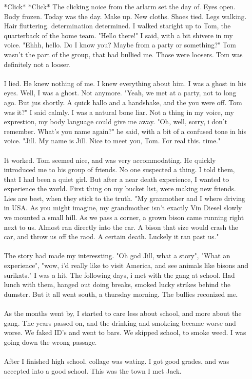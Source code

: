 \documentclass[]{article}
\begin{document}
*Click* *Click* The clicking noice from the arlarm set the day of. Eyes open. Body frozen. Today was the day. Make up. New cloths. Shoes tied. Legs walking. Hair fluttering. determination determined. I walked staright up to Tom, the quarterback of the home team. "Hello there!" I said, with a bit shivere in my voice. "Ehhh, hello. Do I know you? Maybe from a party or something?" Tom wasn't the part of the group, that had bullied me. Those were loosers. Tom was definitely not a looser.
\\ \\
I lied. He knew nothing of me. I knew everything about him. I was a ghost in his eyes. Well, I was a ghost. Not anymore. "Yeah, we met at a party, not to long ago. But jus shortly. A quick hallo and a handshake, and the you were off. Tom was it?" I said calmly. I was a natural bone liar. Not a thing in my voice, my exprestion, my body language could give me away. "Oh, well, sorry, i don't remember. What's you name again?" he said, with a bit of a confused tone in his voice. "Jill. My name is Jill. Nice to meet you, Tom. For real this. time."
\\ \\
It worked. Tom seemed nice, and was very accommodating. He quickly  introduced me to his group of friends. No one suspected a thing. I told them, that I had been a quiet girl. But after a near death experience, I wanted to experience the world. First thing on my bucket list, were making new friends. Lies are best, when they stick to the truth. "My granmother and I where driving in USA. As you might imagine, my grandmother isn't exactly Vin Diesel slowly we mounted a small hill. As we pass a corner, a grown bison came running right next to us. Almost ran directly into the car. A bison that size would crash the car, and throw us off the raod. A certain death. Luckely it ran past us."
\\ \\
The story had made my interessting. "Oh god Jill, what a story", "What an experience", "wow, i'd really like to visit America, and see animals like bisons and surikats." I was a hit. The following days, i met with the gang at school. Had lunch with them, hanged out doing breaks, smoked lucky strikes behind the dumster. But it all went south, a thursday morning. The bullies reconized me.
\\ \\
As the months went by, I started to care less about school, and more about the gang. The years passed on, and the drinking and smokeing became worse and worse. We faked ID's and went to bars. We skipped school, to smoke weed. I was going down the wrong passage.
\\ \\
After I finished high school, collage was wating. I got good grades, and was accepted into a good school. This was the town I met Jack.
\end{document}
